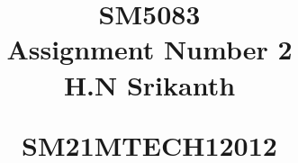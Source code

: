 \documentclass[journal,12pt,twocolumn]{IEEEtran}
\begin{document}
%


\newtheorem{theorem}{Theorem}[section]
\newtheorem{problem}{Problem}
\newtheorem{proposition}{Proposition}[section]
\newtheorem{lemma}{Lemma}[section]
\newtheorem{corollary}[theorem]{Corollary}
\newtheorem{example}{Example}[section]
\newtheorem{definition}[problem]{Definition}
\newcommand{\BEQA}{\begin{eqnarray}}
\newcommand{\EEQA}{\end{eqnarray}}
\newcommand{\define}{\stackrel{\triangle}{=}}

\providecommand{\mbf}{\mathbf}
\providecommand{\pr}[1]{\ensuremath{\Pr\left(#1\right)}}
\providecommand{\qfunc}[1]{\ensuremath{Q\left(#1\right)}}
\providecommand{\sbrak}[1]{\ensuremath{{}\left[#1\right]}}
\providecommand{\lsbrak}[1]{\ensuremath{{}\left[#1\right.}}
\providecommand{\rsbrak}[1]{\ensuremath{{}\left.#1\right]}}
\providecommand{\brak}[1]{\ensuremath{\left(#1\right)}}
\providecommand{\lbrak}[1]{\ensuremath{\left(#1\right.}}
\providecommand{\rbrak}[1]{\ensuremath{\left.#1\right)}}
\providecommand{\cbrak}[1]{\ensuremath{\left\{#1\right\}}}
\providecommand{\lcbrak}[1]{\ensuremath{\left\{#1\right.}}
\providecommand{\rcbrak}[1]{\ensuremath{\left.#1\right\}}}
\theoremstyle{remark}
\newtheorem{rem}{Remark}
\newcommand{\sgn}{\mathop{\mathrm{sgn}}}
\providecommand{\abs}[1]{\lvert#1\rvert}
\providecommand{\res}[1]{\Res\displaylimits_{#1}} 
\providecommand{\norm}[1]{\lVert#1\rVert}
\providecommand{\mtx}[1]{\mathbf{#1}}
\providecommand{\fourier}{\overset{\mathcal{F}}{ \rightleftharpoons}}
\providecommand{\system}{\overset{\mathcal{H}}{ \longleftrightarrow}}
\newcommand{\solution}{\noindent \textbf{Solution: }}
\newcommand{\cosec}{\,\text{cosec}\,}
\providecommand{\dec}[2]{\ensuremath{\overset{#1}{\underset{#2}{\gtrless}}}}
\newcommand{\myvec}[1]{\ensuremath{\begin{pmatrix}#1\end{pmatrix}}}
\newcommand{\cmyvec}[1]{\ensuremath{\begin{pmatrix*}[c]#1\end{pmatrix*}}}
\newcommand{\mydet}[1]{\ensuremath{\begin{vmatrix}#1\end{vmatrix}}}
\newcommand{\proj}[2]{\textbf{proj}_{\vec{#1}}\vec{#2}}
\newcommand{\RNum}[1]{\uppercase\expandafter{\romannumeral #1\relax}}
\let\StandardTheFigure\thefigure
\let\vec\mathbf
\title{
\LARGE SM5083\\
    \LARGE Assignment Number 2 \\[0.5em]
    
    \large H.N Srikanth\par
    \large   SM21MTECH12012  \par
}
\maketitle
\renewcommand{\thefigure}{\theenumi}
\renewcommand{\thetable}{\theenumi}
\end{document}
